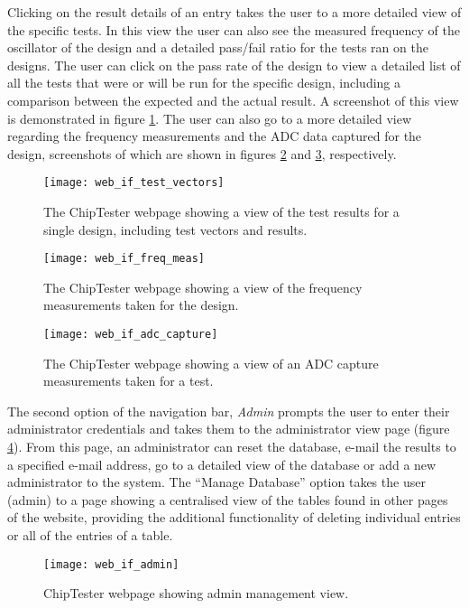 Clicking on the result details of an entry takes the user to a more detailed view of the specific tests. In this view the user can also see the measured frequency of the oscillator of the design and a detailed pass/fail ratio for the tests ran on the designs. The user can click on the pass rate of the design to view a detailed list of all the tests that were or will be run for the specific design, including a comparison between the expected and the actual result. A screenshot of this view is demonstrated in figure \ref{fig:web_if_test_vectors}. The user can also go to a more detailed view regarding the frequency measurements and the ADC data captured for the design, screenshots of which are shown in figures \ref{fig:web_if_freq_meas} and \ref{fig:web_if_adc_capture}, respectively.

\begin{figure}[ht]
 \centering
 \texttt{[image: web\_if\_test\_vectors]}
 \caption{The ChipTester webpage showing a view of the test results for a single design, including test vectors and results.}
 \label{fig:web_if_test_vectors}
\end{figure}

\begin{figure}[ht]
 \centering
 \texttt{[image: web\_if\_freq\_meas]}
 \caption{The ChipTester webpage showing a view of the frequency measurements taken for the design.}
 \label{fig:web_if_freq_meas}
\end{figure}

\begin{figure}[ht]
 \centering
 \texttt{[image: web\_if\_adc\_capture]}
 \caption{The ChipTester webpage showing a view of an ADC capture measurements taken for a test.}
 \label{fig:web_if_adc_capture}
\end{figure}

The second option of the navigation bar, \textit{Admin} prompts the user to enter their administrator credentials and takes them to the administrator view page (figure \ref{fig:web_if_admin}). From this page, an administrator can reset the database, e-mail the results to a specified e-mail address, go to a detailed view of the database or add a new administrator to the system. The ``Manage Database'' option takes the user (admin) to a page showing a centralised view of the tables found in other pages of the website, providing the additional functionality of deleting individual entries or all of the entries of a table.

\begin{figure}[ht]
 \centering
 \texttt{[image: web\_if\_admin]}
 \caption{ChipTester webpage showing admin management view.}
 \label{fig:web_if_admin}
\end{figure}


